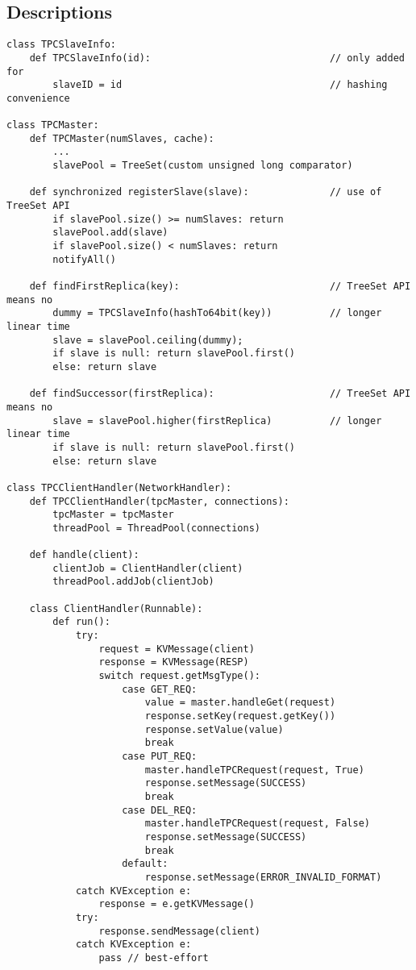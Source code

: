 \subsection{Descriptions}
\begin{verbatim}
class TPCSlaveInfo:
    def TPCSlaveInfo(id):                               // only added for
        slaveID = id                                    // hashing convenience

class TPCMaster:
    def TPCMaster(numSlaves, cache):
        ...
        slavePool = TreeSet(custom unsigned long comparator)

    def synchronized registerSlave(slave):              // use of TreeSet API
        if slavePool.size() >= numSlaves: return
        slavePool.add(slave)
        if slavePool.size() < numSlaves: return
        notifyAll()

    def findFirstReplica(key):                          // TreeSet API means no
        dummy = TPCSlaveInfo(hashTo64bit(key))          // longer linear time
        slave = slavePool.ceiling(dummy);
        if slave is null: return slavePool.first()
        else: return slave

    def findSuccessor(firstReplica):                    // TreeSet API means no
        slave = slavePool.higher(firstReplica)          // longer linear time
        if slave is null: return slavePool.first()
        else: return slave

class TPCClientHandler(NetworkHandler):
    def TPCClientHandler(tpcMaster, connections):
        tpcMaster = tpcMaster
        threadPool = ThreadPool(connections)

    def handle(client):
        clientJob = ClientHandler(client)
        threadPool.addJob(clientJob)

    class ClientHandler(Runnable):
        def run():
            try:
                request = KVMessage(client)
                response = KVMessage(RESP)
                switch request.getMsgType():
                    case GET_REQ:
                        value = master.handleGet(request)
                        response.setKey(request.getKey())
                        response.setValue(value)
                        break
                    case PUT_REQ:
                        master.handleTPCRequest(request, True)
                        response.setMessage(SUCCESS)
                        break
                    case DEL_REQ:
                        master.handleTPCRequest(request, False)
                        response.setMessage(SUCCESS)
                        break
                    default:
                        response.setMessage(ERROR_INVALID_FORMAT)
            catch KVException e:
                response = e.getKVMessage()
            try:
                response.sendMessage(client)
            catch KVException e:
                pass // best-effort
\end{verbatim}
